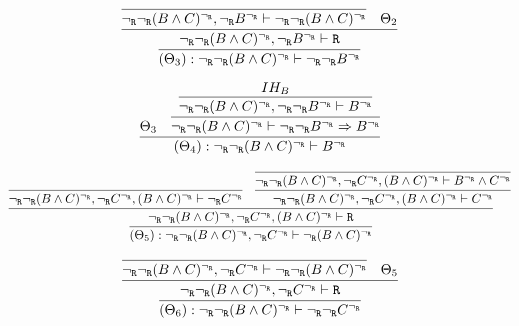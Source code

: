 \begin{enumerate}[(i)]
\begin{itemize}
            $$
            \infer{
                    (\Theta_3) : \ngr\ngr(B \wedge C)^\ngr \vdash \ngr\ngr B^\ngr
                }{
                    \infer{
                        \ngr\ngr(B \wedge C)^\ngr, \ngr B^\ngr \vdash \R
                    }{
                        \infer{
                            \ngr\ngr(B \wedge C)^\ngr, \ngr B^\ngr \vdash \ngr\ngr(B \wedge C)^\ngr
                        }{
                        }&
                        \Theta_2
                    }
                }
            $$        
        
            $$
            \infer{
                (\Theta_4) : \ngr\ngr(B \wedge C)^\ngr \vdash B^\ngr
            }{
                \Theta_3
                &
                \infer{
                    \ngr\ngr(B \wedge C)^\ngr \vdash \ngr\ngr B^\ngr \Rightarrow  B^\ngr
                }{
                    \infer{
                        \ngr\ngr(B \wedge C)^\ngr, \ngr\ngr B^\ngr \vdash  B^\ngr
                    }{
                        IH_B
                    }
                }
            }
            $$
            
            $$
            \infer{
                            (\Theta_5) : \ngr\ngr(B \wedge C)^\ngr, \ngr C^\ngr \vdash \ngr(B \wedge C)^\ngr
                        }{
                            \infer{
                                \ngr\ngr(B \wedge C)^\ngr, \ngr C^\ngr, (B \wedge C)^\ngr \vdash \R
                            }{
                                \infer{
                                    \ngr\ngr(B \wedge C)^\ngr, \ngr C^\ngr, (B \wedge C)^\ngr \vdash \ngr C^\ngr
                                }{
                                }&
                                \infer{
                                    \ngr\ngr(B \wedge C)^\ngr, \ngr C^\ngr, (B \wedge C)^\ngr \vdash C^\ngr
                                }{
                                    \infer{
                                        \ngr\ngr(B \wedge C)^\ngr, \ngr C^\ngr, (B \wedge C)^\ngr \vdash B^\ngr \wedge C^\ngr
                                    }{
                                    }
                                }
                            }
                        }
            $$        
        
            $$
            \infer{
                    (\Theta_6) : \ngr\ngr(B \wedge C)^\ngr \vdash \ngr\ngr C^\ngr
                }{
                    \infer{
                        \ngr\ngr(B \wedge C)^\ngr, \ngr C^\ngr \vdash \R
                    }{
                        \infer{
                            \ngr\ngr(B \wedge C)^\ngr, \ngr C^\ngr \vdash \ngr\ngr(B \wedge C)^\ngr
                        }{
                        }&
                        \Theta_5
                    }
                }
            $$        
        

\end{itemize}
\end{enumerate}
